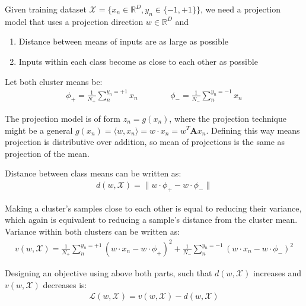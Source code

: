 \documentclass[a4paper,11pt]{article}
\begin{document}
\begin{mlsolution} 

Given training dataset $\mathcal{X} = \{x_n \in \mathbb{R}^D, y_n \in \{-1, +1\}\}$, we need a projection model that uses a projection direction $w \in \mathbb{R}^D$ and
\begin{enumerate}[noitemsep]
    \item Distance between means of inputs are as large as possible
    \item Inputs within each class become as close to each other as possible
\end{enumerate}

Let both cluster means be:
\begin{align*}
\phi_{+} = \frac{1}{N_+} \sum_{n}^{y_n = +1} x_n
\;\;\;\;\;\;\;\;\;\;\;\;\;\;
\phi_- = \frac{1}{N_-} \sum_{n}^{y_n = -1} x_n
\end{align*}

The projection model is of form $z_n = g(x_n)$, where the projection technique might be a general $g(x_n) = \langle w, x_n \rangle = w \cdot x_n = w^T \textbf{A} x_n$.
Defining this way means projection is distributive over addition, so mean of projections is the same as projection of the mean.

Distance between class means can be written as:
\begin{align}
    d(w, \mathcal{X}) = \big\lVert w \cdot \phi_+ - w \cdot \phi_- \big\rVert
\end{align}

Making a cluster's samples close to each other is equal to reducing their variance, which again is equivalent to reducing a sample's distance from the cluster mean.
Variance within both clusters can be written as:
\begin{align}
    v(w, \mathcal{X}) = \frac{1}{N_+}\sum_{n}^{y_n=+1} (w \cdot x_n - w \cdot \phi_+)^2 +
    \frac{1}{N_-}\sum_{n}^{y_n=-1} (w \cdot x_n - w \cdot \phi_-)^2
\end{align}

Designing an objective using above both parts, such that $d(w, \mathcal{X})$ increases and $v(w, \mathcal{X})$ decreases is:
\begin{align}
    \mathcal{L}(w, \mathcal{X}) = v(w, \mathcal{X}) - d(w, \mathcal{X})
\end{align}

\end{mlsolution}
\end{document}
